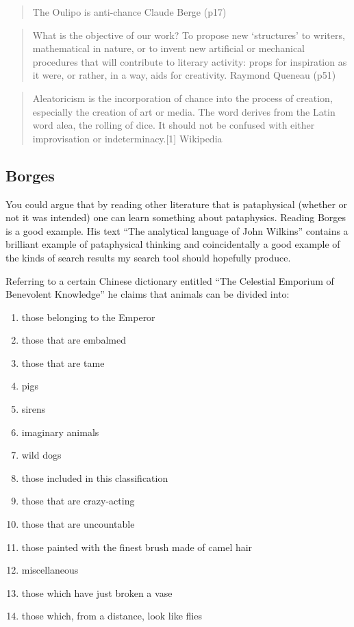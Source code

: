 \begin{quote}
  The Oulipo is anti-chance Claude Berge (p17)
\end{quote}

\begin{quote}
  What is the objective of our work? To propose new `structures' to writers, mathematical in nature, or to invent new artificial or mechanical procedures that will contribute to literary activity: props for inspiration as it were, or rather, in a way, aids for creativity. Raymond Queneau (p51)
\end{quote}

\begin{quote}
  Aleatoricism is the incorporation of chance into the process of creation, especially the creation of art or media. The word derives from the Latin word alea, the rolling of dice. It should not be confused with either improvisation or indeterminacy.[1] Wikipedia
\end{quote}


\subsection{Borges}

You could argue that by reading other literature that is pataphysical (whether or not it was intended) one can learn something about pataphysics. Reading Borges \autocite{Borges1964, Borges1999, Borges1957, Borges2010a, Borges2010b, Borges2000} is a good example. His text ``The analytical language of John Wilkins'' \autocite{Borges2000} contains a brilliant example of pataphysical thinking and coincidentally a good example of the kinds of search results my search tool should hopefully produce.

Referring to a certain Chinese dictionary entitled ``The Celestial Emporium of Benevolent Knowledge'' he claims that animals can be divided into:

\begin{enumerate}
  \item	those belonging to the Emperor
  \item	those that are embalmed
  \item	those that are tame
  \item	pigs
  \item	sirens
  \item	imaginary animals
  \item	wild dogs
  \item	those included in this classification
  \item	those that are crazy-acting
  \item	those that are uncountable
  \item	those painted with the finest brush made of camel hair
  \item	miscellaneous
  \item	those which have just broken a vase
  \item	those which, from a distance, look like flies
\end{enumerate}

